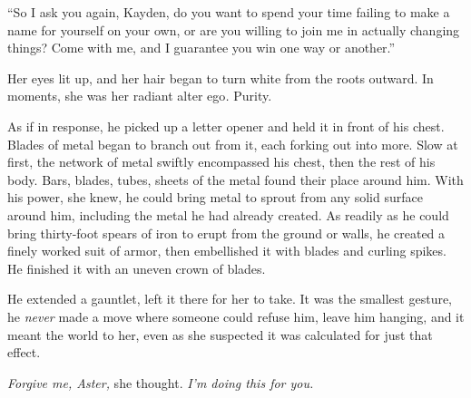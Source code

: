 ``So I ask you again, Kayden, do you want to spend your time failing to make a name for yourself on your own, or are you willing to join me in actually changing things?  Come with me, and I guarantee you win one way or another.''



Her eyes lit up, and her hair began to turn white from the roots outward.  In moments, she was her radiant alter ego\emph{.  }Purity.



As if in response, he picked up a letter opener and held it in front of his chest.  Blades of metal began to branch out from it, each forking out into more.  Slow at first, the network of metal swiftly encompassed his chest, then the rest of his body.  Bars, blades, tubes, sheets of the metal found their place around him.  With his power, she knew, he could bring metal to sprout from any solid surface around him, including the metal he had already created.  As readily as he could bring thirty-foot spears of iron to erupt from the ground or walls, he created a finely worked suit of armor, then embellished it with blades and curling spikes.  He finished it with an uneven crown of blades.



He extended a gauntlet, left it there for her to take.  It was the smallest gesture, he \emph{never} made a move where someone could refuse him, leave him hanging, and it meant the world to her, even as she suspected it was calculated for just that effect.



\emph{Forgive me, Aster,} she thought.  \emph{I'm doing this for you.}






